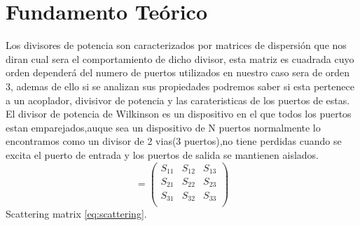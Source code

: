 \documentclass[a4paper]{IEEEtran} %
\begin{document}
\section{Fundamento Teórico}
\label{sec:fundamento}
Los divisores de potencia son caracterizados por matrices de dispersión que nos diran cual sera el comportamiento de dicho divisor, esta matriz es cuadrada cuyo orden dependerá del numero de puertos utilizados en nuestro caso sera de orden 3, ademas de ello si se analizan sus propiedades podremos saber si esta pertenece a un acoplador, divisivor de potencia y las carateristicas de los puertos de estas\cite{pozar2012microwave}. El divisor de potencia de Wilkinson es un dispositivo en el que todos los puertos estan emparejados,auque sea un dispositivo de N puertos normalmente lo encontramos como un divisor de 2 vias(3 puertos),no tiene perdidas cuando se excita el puerto de entrada y los puertos de salida se mantienen aislados.
\vspace{5mm}
\begin{equation}
[S]=
\begin{pmatrix}
S_{11}&S_{12}&S_{13}\\
S_{21}&S_{22}&S_{23}\\
S_{31}&S_{32}&S_{33}\\
\end{pmatrix}
\label{eq:scattering}
\end{equation}
Scattering matrix \ref{eq:scattering}.
\vspace{5mm}
\end{document}
